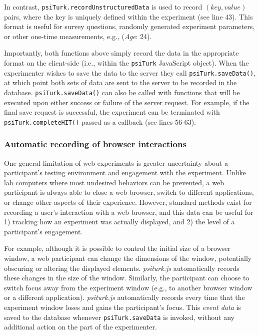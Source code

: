 \documentclass[twocolumn]{svjour3}          %
\newcommand{\psiturkjs}[0]{\emph{psiturk.js}}
\begin{document}
In contrast, \texttt{psiTurk.recordUnstructuredData} is used to record $(key, value)$ pairs, where the key is uniquely defined within the experiment (see line 43).
This format is useful for survey questions, randomly generated experiment parameters, or other one-time measurements, e.g., (\emph{Age}: 24).

Importantly, both functions above simply record the data in the appropriate format on the client-side (i.e., within the \texttt{psiTurk} JavaScript object).
When the experimenter wishes to save the data to the server they call \texttt{psiTurk.saveData()}, at which point both sets of data are sent to the server to be recorded in the database.
\texttt{psiTurk.saveData()} can also be called with functions that will be executed upon either success or failure of the server request.
For example, if the final save request is successful, the experiment can be terminated with \texttt{psiTurk.completeHIT()} passed as a callback (see lines 56-63).  

\subsubsection{Automatic recording of browser interactions}
 
One general limitation of web experiments is greater uncertainty about a participant's testing environment and engagement with the experiment.
Unlike lab computers where most undesired behaviors can be prevented, a web participant is always able to close a web browser, switch to different applications, or change other aspects of their experience.
However, standard methods exist for recording a user's interaction with a web browser, and this data can be useful for 1) tracking how an experiment was actually displayed, and 2) the level of a participant's engagement.

For example, although it is possible to control the initial size of a browser window, a web participant can change the dimensions of the window, potentially obscuring or altering the displayed elements.
\psiturkjs{} automatically records these changes in the size of the window.
Similarly, the participant can choose to switch focus away from the experiment window (e.g., to another browser window or a different application).
\psiturkjs{} automatically records every time that the experiment window loses and gains the participant's focus.
This \emph{event data} is saved to the database whenever \texttt{psiTurk.saveData} is invoked, without any additional action on the part of the experimenter. \\
\end{document}
